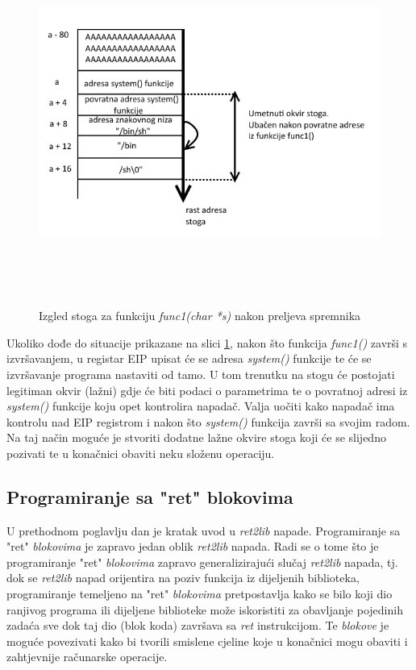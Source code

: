 \documentclass[times, utf8, diplomski, numeric]{fer}
\begin{document}
\begin{figure}[!htb]
\centering
\setlength\fboxsep{0pt}
\setlength\fboxrule{0.5pt}
\includegraphics[width=13cm, height=12cm]{slike/ret2lib}
\caption{Izgled stoga za funkciju \emph{func1(char *s)} nakon preljeva spremnika}
\label{fig:ret2lib} 
\end{figure}

Ukoliko dođe do situacije prikazane na slici \ref{fig:ret2lib},
nakon što funkcija \emph{func1()} završi s izvršavanjem, u
registar EIP upisat će se adresa \emph{system()} funkcije te će
se izvršavanje programa nastaviti od tamo. U tom trenutku na
stogu će postojati legitiman okvir (lažni) gdje će biti podaci o
parametrima te o povratnoj adresi iz \emph{system()} funkcije
koju opet kontrolira napadač. Valja uočiti kako napadač ima
kontrolu nad EIP registrom i nakon što \emph{system()} funkcija
završi sa svojim radom. Na taj način moguće je stvoriti dodatne
lažne okvire stoga koji će se slijedno pozivati te u konačnici
obaviti neku složenu operaciju. 

\subsection{Programiranje sa "ret" blokovima}
\label{sct:rop2}

U prethodnom poglavlju dan je kratak uvod u \emph{ret2lib}
napade. Programiranje sa "ret" \emph{blokovima} je zapravo jedan oblik
\emph{ret2lib} napada. Radi se o tome što je programiranje "ret" 
\emph{blokovima} zapravo generalizirajući slučaj \emph{ret2lib} napada,
tj. dok se \emph{ret2lib} napad orijentira na poziv funkcija iz
dijeljenih biblioteka, programiranje temeljeno na "ret" \emph{blokovima}
pretpostavlja kako se bilo koji dio ranjivog programa ili
dijeljene biblioteke može iskoristiti za obavljanje pojedinih
zadaća sve dok taj dio (blok koda) završava sa \emph{ret}
instrukcijom. Te \emph{blokove} je moguće povezivati kako bi tvorili
smislene cjeline koje u konačnici mogu obaviti i zahtjevnije
računarske operacije.
\end{document}
